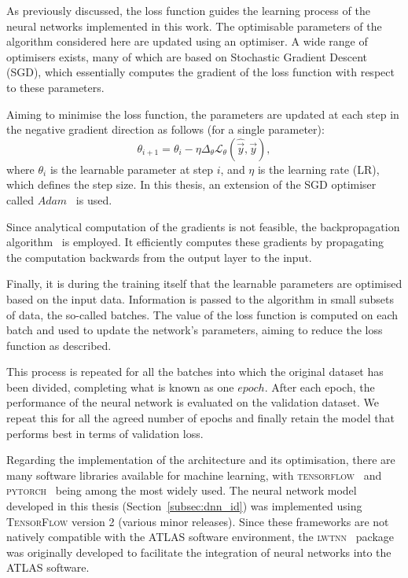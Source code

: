 As previously discussed, the loss function guides the learning process of the neural networks implemented in this work. The optimisable parameters of the algorithm considered here are updated using an optimiser. A wide range of optimisers exists, many of which are based on Stochastic Gradient Descent (SGD), which essentially computes the gradient of the loss function with respect to these parameters.

Aiming to minimise the loss function, the parameters are updated at each step in the negative gradient direction as follows (for a single parameter):
\begin{equation}
    \theta_{i+1} = \theta_{i} - \eta \Delta_{\theta}\mathcal{L}_{\theta}(\hat{\vec{y}},\vec{y}),
\end{equation}
where $\theta_{i}$ is the learnable parameter at step $i$, and $\eta$ is the learning rate (LR), which defines the step size. In this thesis, an extension of the SGD optimiser called $Adam$~\cite{kingma2017adammethodstochasticoptimization} is used.

Since analytical computation of the gradients is not feasible, the backpropagation algorithm~\cite{Rumelhart1986LearningRB} is employed. It efficiently computes these gradients by propagating the computation backwards from the output layer to the input.

Finally, it is during the training itself that the learnable parameters are optimised based on the input data. Information is passed to the algorithm in small subsets of data, the so-called batches. The value of the loss function is computed on each batch and used to update the network's parameters, aiming to reduce the loss function as described.

This process is repeated for all the batches into which the original dataset has been divided, completing what is known as one $epoch$. After each epoch, the performance of the neural network is evaluated on the validation dataset. We repeat this for all the agreed number of epochs and finally retain the model that performs best in terms of validation loss.

Regarding the implementation of the architecture and its optimisation, there are many software libraries available for machine learning, with \textsc{tensorflow}~\cite{tensorflow2015} and \textsc{pytorch}~\cite{pytorch} being among the most widely used. The neural network model developed in this thesis (Section~\ref{subsec:dnn_id}) was implemented using \textsc{TensorFlow} version 2 (various minor releases). Since these frameworks are not natively compatible with the ATLAS software environment, the \textsc{lwtnn}~\cite{lwtnn,lwtnn2} package was originally developed to facilitate the integration of neural networks into the ATLAS software.

